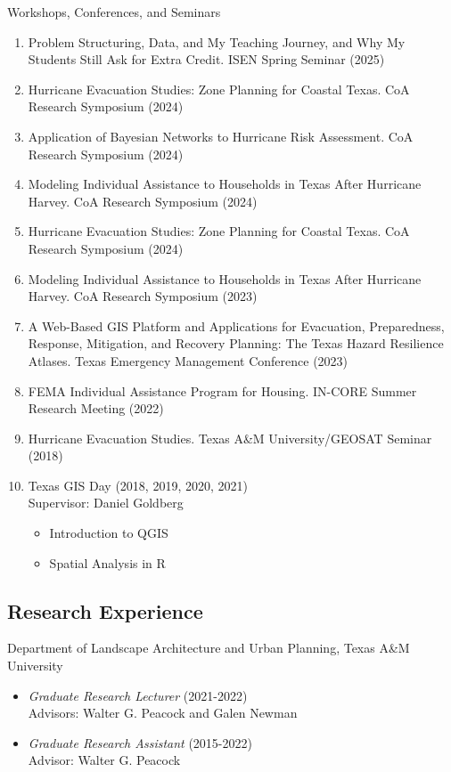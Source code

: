 \documentclass[11pt,oneside]{article}
\begin{document}
\vspace{3pt}

{Workshops, Conferences, and Seminars}
\begin{enumerate}[leftmargin=20pt]
\item Problem Structuring, Data, and My Teaching Journey, and Why My Students Still Ask for Extra Credit. ISEN Spring Seminar (2025)
\item Hurricane Evacuation Studies: Zone Planning for Coastal Texas. CoA Research Symposium (2024)
\item Application of Bayesian Networks to Hurricane Risk Assessment. CoA Research Symposium (2024)
\item Modeling Individual Assistance to Households ​in Texas After Hurricane Harvey. CoA Research Symposium (2024)
\item Hurricane Evacuation Studies: Zone Planning for Coastal Texas. CoA Research Symposium (2024)
\item Modeling Individual Assistance to Households ​in Texas After Hurricane Harvey. CoA Research Symposium (2023)
\item A Web-Based GIS Platform and Applications for Evacuation, Preparedness, Response, Mitigation, and Recovery Planning: The Texas Hazard Resilience Atlases. Texas Emergency Management Conference (2023)\\
\item FEMA Individual Assistance Program for Housing. IN-CORE Summer Research Meeting (2022)
\item Hurricane Evacuation Studies. Texas A\&M University/GEOSAT Seminar (2018)
\item Texas GIS Day (2018, 2019, 2020, 2021)\\
      Supervisor: Daniel Goldberg
\begin{itemize}
\item Introduction to QGIS
\item Spatial Analysis in R
\end{itemize}
\end{enumerate}


\subsection*{Research Experience}
{Department of Landscape Architecture and Urban Planning, Texas A\&M University}
\begin{itemize}[leftmargin=20pt]
\item \emph{Graduate Research Lecturer} (2021-2022)\\
      Advisors: Walter G. Peacock and Galen Newman
\item \emph{Graduate Research Assistant} (2015-2022)\\
      Advisor: Walter G. Peacock
\end{itemize}
\end{document}
